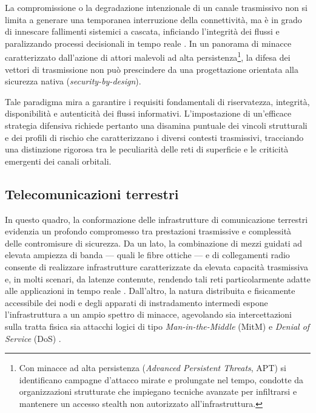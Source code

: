 La compromissione o la degradazione intenzionale di un canale trasmissivo non si limita a generare una temporanea interruzione della connettività, ma è in grado di innescare fallimenti sistemici a cascata, inficiando l'integrità dei flussi e paralizzando processi decisionali in tempo reale \cite{stallings2020}. 
In un panorama di minacce caratterizzato dall'azione di attori malevoli ad alta persistenza\footnote{Con minacce ad alta persistenza (\textit{Advanced Persistent Threats}, APT) si identificano campagne d'attacco mirate e prolungate nel tempo, condotte da organizzazioni strutturate che impiegano tecniche avanzate per infiltrarsi e mantenere un accesso stealth non autorizzato all'infrastruttura.}, la difesa dei vettori di trasmissione non può prescindere da una progettazione orientata alla sicurezza nativa (\textit{security-by-design}).

Tale paradigma mira a garantire i requisiti fondamentali di riservatezza, integrità, disponibilità e autenticità dei flussi informativi. 
L'impostazione di un'efficace strategia difensiva richiede pertanto una disamina puntuale dei vincoli strutturali e dei profili di rischio che caratterizzano i diversi contesti trasmissivi, tracciando una distinzione rigorosa tra le peculiarità delle reti di superficie e le criticità emergenti dei canali orbitali.

\subsection{Telecomunicazioni terrestri}
\label{subsec:telecomunicazioni_terrestri}

In questo quadro, la conformazione delle infrastrutture di comunicazione terrestri evidenzia un profondo compromesso tra prestazioni trasmissive e complessità delle contromisure di sicurezza. 
Da un lato, la combinazione di mezzi guidati ad elevata ampiezza di banda — quali le fibre ottiche — e di collegamenti radio consente di realizzare infrastrutture caratterizzate da elevata capacità trasmissiva e, in molti scenari, da latenze contenute, rendendo tali reti particolarmente adatte alle applicazioni in tempo reale \cite{tanenbaum2020}.
Dall'altro, la natura distribuita e fisicamente accessibile dei nodi e degli apparati di instradamento intermedi espone l'infrastruttura a un ampio spettro di minacce, agevolando sia intercettazioni sulla tratta fisica sia attacchi logici di tipo \textit{Man-in-the-Middle} (MitM) e \textit{Denial of Service} (DoS) \cite{stallings2020}.

